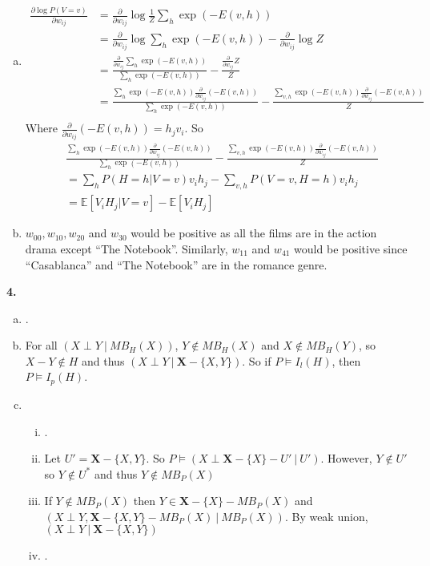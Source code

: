 \documentclass{article}
\begin{document}
\begin{enumerate}[(a)]
    \item \begin{align*}
        \frac{\partial \log P(V = v)}{\partial w_{ij}} &= \frac{\partial}{\partial w_{ij}} \log \frac{1}{Z}\sum_{h}\exp(-E(v, h)) \\[0.5ex] 
        &= \frac{\partial}{\partial w_{ij}} \log \sum_{h} \exp(-E(v, h)) - \frac{\partial}{\partial w_{ij}} \log Z \\[0.5ex]
        &= \frac{\frac{\partial}{\partial w_{ij}}\sum_h \exp(-E(v, h))}{\sum_h \exp(-E(v,h))} - \frac{\frac{\partial}{\partial w_{ij}} Z}{Z} \\[0.5ex]
        &= \frac{\sum_h \exp(-E(v, h))\frac{\partial}{\partial w_{ij}}(-E(v, h))}{\sum_h \exp(-E(v, h))} - \frac{\sum_{v, h}\exp(-E(v,h))\frac{\partial}{\partial w_{ij}}(-E(v,h))}{Z} \\[0.5ex]
    \end{align*}
    Where $\frac{\partial}{\partial w_{ij}}(-E(v, h)) = h_jv_i$. So 
    \begin{align*}
       & \frac{\sum_h \exp(-E(v, h))\frac{\partial}{\partial w_{ij}}(-E(v, h))}{\sum_h \exp(-E(v, h))} - \frac{\sum_{v, h}\exp(-E(v,h))\frac{\partial}{\partial w_{ij}}(-E(v,h))}{Z} \\[0.5ex]
       &=  \sum_h P(H = h|V = v)v_ih_j - \sum_{v,h}P(V = v, H = h)v_ih_j \\[0.5ex]
       &= \mathbb{E}[V_iH_j|V = v] - \mathbb{E}[V_iH_j]
    \end{align*}
    \item $w_{00}, w_{10}, w_{20}$ and $w_{30}$ would be positive as all the films are in the action drama except ``The Notebook''. Similarly, $w_{11}$ and $w_{41}$ would be positive since ``Casablanca'' and ``The Notebook'' are in the romance genre.
\end{enumerate}
\textbf{4.} \begin{enumerate}[(a)]
    \item .
    \item For all $(X \perp Y\ |\ MB_H(X))$, $Y \notin MB_H(X)$ and $X \notin MB_H(Y)$, so $X - Y \notin H$ and thus $(X \perp Y\ |\ \mathbf{X} - \{X, Y \})$. So if $P \vDash I_{l}(H)$, then $P \vDash I_{p}(H)$.
    \item \begin{enumerate}[(i)]
        \item .
        \item Let $U' = \mathbf{X} - \{X, Y\}$. So $P \vDash (X \perp \mathbf{X} - \{X\} - U'\ |\ U')$. However, $Y \notin U'$ so $Y \notin U^*$ and thus $Y \notin MB_P(X)$
        \item If $Y \notin MB_P(X)$ then $Y \in \mathbf{X} - \{X\} - MB_P(X)$ and $(X \perp Y, \mathbf{X} - \{X, Y\} - MB_P(X)\ |\ MB_P(X) )$. By weak union,  $(X \perp Y\ |\ \mathbf{X} - \{X, Y\})$
        \item .
    \end{enumerate}
\end{enumerate}
\end{document}
